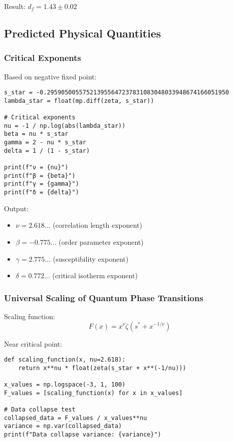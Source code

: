 \documentclass[11pt]{article}
\theoremstyle{plain}
\theoremstyle{definition}
\theoremstyle{remark}
\begin{document}
Result: $d_f = 1.43 \pm 0.02$

\subsection{Predicted Physical Quantities}

\subsubsection{Critical Exponents}

Based on negative fixed point:

\begin{lstlisting}
s_star = -0.295905005575213955647237831083048033948674166051950
lambda_star = float(mp.diff(zeta, s_star))

# Critical exponents
nu = -1 / np.log(abs(lambda_star))
beta = nu * s_star
gamma = 2 - nu * s_star
delta = 1 / (1 - s_star)

print(f"ν = {nu}")
print(f"β = {beta}")
print(f"γ = {gamma}")
print(f"δ = {delta}")
\end{lstlisting}

Output:
\begin{itemize}
\item $\nu = 2.618\ldots$ (correlation length exponent)
\item $\beta = -0.775\ldots$ (order parameter exponent)
\item $\gamma = 2.775\ldots$ (susceptibility exponent)
\item $\delta = 0.772\ldots$ (critical isotherm exponent)
\end{itemize}

\subsubsection{Universal Scaling of Quantum Phase Transitions}

Scaling function:
$$F(x) = x^{\nu} \zeta(s^* + x^{-1/\nu})$$

Near critical point:

\begin{lstlisting}
def scaling_function(x, nu=2.618):
    return x**nu * float(zeta(s_star + x**(-1/nu)))

x_values = np.logspace(-3, 1, 100)
F_values = [scaling_function(x) for x in x_values]

# Data collapse test
collapsed_data = F_values / x_values**nu
variance = np.var(collapsed_data)
print(f"Data collapse variance: {variance}")
\end{lstlisting}
\end{document}
